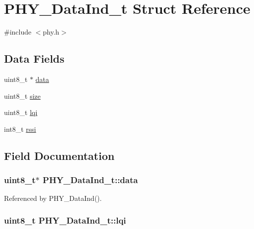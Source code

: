 \hypertarget{struct_p_h_y___data_ind__t}{\section{P\-H\-Y\-\_\-\-Data\-Ind\-\_\-t Struct Reference}
\label{struct_p_h_y___data_ind__t}
}


{\ttfamily \#include $<$phy.\-h$>$}

\subsection*{Data Fields}
\begin{DoxyCompactItemize}
\item 
uint8\-\_\-t $\ast$ \hyperlink{struct_p_h_y___data_ind__t_abc4a667b973e3ab1841ce52c142a79b6}{data}
\item 
uint8\-\_\-t \hyperlink{struct_p_h_y___data_ind__t_ae250a8fcfc37e4af4171a8753374a53b}{size}
\item 
uint8\-\_\-t \hyperlink{struct_p_h_y___data_ind__t_a89f75514d8c2b2fdcb97a8d313636f76}{lqi}
\item 
int8\-\_\-t \hyperlink{struct_p_h_y___data_ind__t_ae39080c0fe21e6c1716222c6231d370b}{rssi}
\end{DoxyCompactItemize}


\subsection{Field Documentation}
\hypertarget{struct_p_h_y___data_ind__t_abc4a667b973e3ab1841ce52c142a79b6}{
\subsubsection[{data}]{\setlength{\rightskip}{0pt plus 5cm}uint8\-\_\-t$\ast$ P\-H\-Y\-\_\-\-Data\-Ind\-\_\-t\-::data}}\label{struct_p_h_y___data_ind__t_abc4a667b973e3ab1841ce52c142a79b6}


Referenced by P\-H\-Y\-\_\-\-Data\-Ind().

\hypertarget{struct_p_h_y___data_ind__t_a89f75514d8c2b2fdcb97a8d313636f76}{
\subsubsection[{lqi}]{\setlength{\rightskip}{0pt plus 5cm}uint8\-\_\-t P\-H\-Y\-\_\-\-Data\-Ind\-\_\-t\-::lqi}}\label{struct_p_h_y___data_ind__t_a89f75514d8c2b2fdcb97a8d313636f76}


